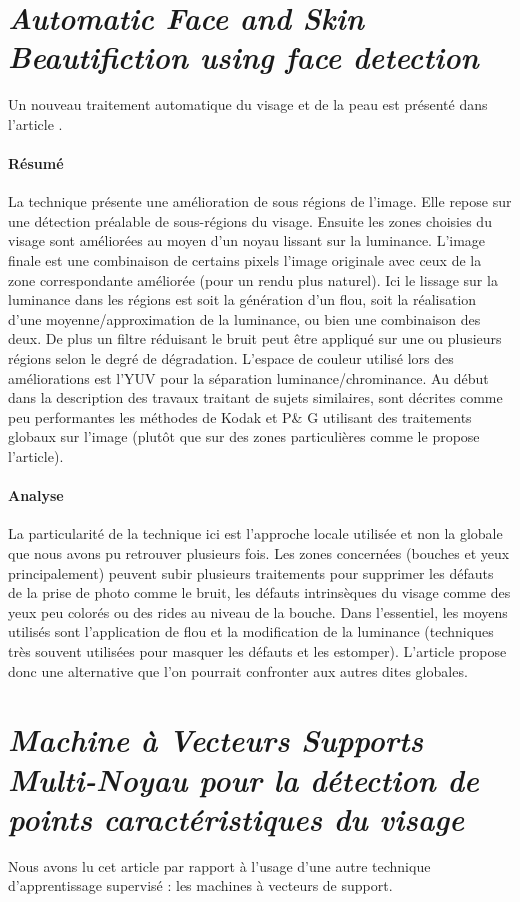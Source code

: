 \documentclass[11pt, french,screen]{report-rd-info}
\begin{document}
\section{\emph{Automatic Face and Skin Beautifiction using face detection}}
Un nouveau traitement automatique du visage et de la peau est présenté dans l’article \cite{Ciuc2010}.
\paragraph{Résumé}
La technique présente une amélioration de sous régions de l’image.  Elle repose sur une détection préalable de sous-régions du visage. Ensuite les zones choisies du visage sont améliorées au moyen d'un noyau lissant sur la luminance. L'image finale est une combinaison de certains pixels l'image originale avec ceux de la zone correspondante améliorée (pour un rendu plus naturel).
Ici le lissage sur la luminance dans les régions est soit la génération d’un flou, soit la réalisation d’une moyenne/approximation de la luminance, ou bien une combinaison des deux. De plus un filtre réduisant le bruit peut être appliqué sur une ou plusieurs régions selon le degré de dégradation.
L’espace de couleur utilisé lors des améliorations est l’YUV pour la séparation luminance/chrominance.
Au début dans la description des travaux traitant de sujets similaires, sont décrites comme peu performantes les méthodes de Kodak et P\& G utilisant des traitements globaux sur l'image (plutôt que sur des zones particulières comme le propose l’article).
\paragraph{Analyse}
La particularité de la technique ici est l’approche locale utilisée et non la globale que nous avons pu retrouver plusieurs fois. Les zones concernées (bouches et yeux principalement) peuvent subir plusieurs traitements pour supprimer les défauts de la prise de photo comme le bruit, les défauts intrinsèques du visage comme des yeux peu colorés ou des rides au niveau de la bouche.
Dans l’essentiel, les moyens utilisés sont l’application de flou et la modification de la luminance (techniques très souvent utilisées pour masquer les défauts et les estomper). L’article propose donc une alternative que l’on pourrait confronter aux autres dites globales.
\section{\emph{Machine à Vecteurs Supports Multi-Noyau pour la détection de points caractéristiques du visage}}
Nous avons lu cet article \cite{Rapp2012} par rapport à l’usage d’une autre technique d’apprentissage supervisé : les machines à vecteurs de support.
\end{document}
